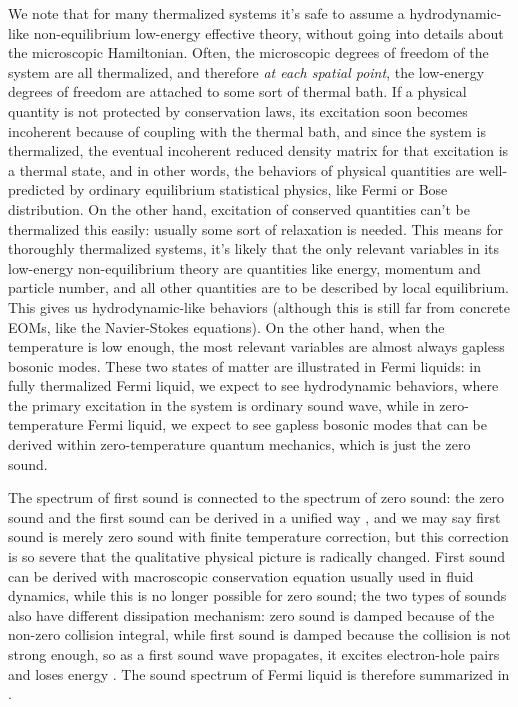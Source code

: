 \documentclass[hyperref, a4paper]{article}
\begin{document}
We note that for many thermalized systems it's safe to assume 
a hydrodynamic-like non-equilibrium low-energy effective theory,
without going into details about the microscopic Hamiltonian.
Often, the microscopic degrees of freedom of the system are all thermalized,
and therefore \emph{at each spatial point},
the low-energy degrees of freedom are attached to some sort of thermal bath.
If a physical quantity is not protected by conservation laws,
its excitation soon becomes incoherent because of coupling with the thermal bath,
and since the system is thermalized,
the eventual incoherent reduced density matrix for that excitation is a thermal state,
and in other words, the behaviors of physical quantities are well-predicted 
by ordinary equilibrium statistical physics,
like Fermi or Bose distribution.
On the other hand, excitation of conserved quantities can't be thermalized this easily:
usually some sort of relaxation is needed.
This means for thoroughly thermalized systems,
it's likely that the only relevant variables in its low-energy non-equilibrium theory 
are quantities like energy, momentum and particle number,
and all other quantities are to be described by local equilibrium.
This gives us hydrodynamic-like behaviors 
(although this is still far from concrete EOMs, like the Navier-Stokes equations).
On the other hand, when the temperature is low enough,
the most relevant variables are almost always gapless bosonic modes.
These two states of matter are illustrated in Fermi liquids:
in fully thermalized Fermi liquid, we expect to see hydrodynamic behaviors,
where the primary excitation in the system is ordinary sound wave,
while in zero-temperature Fermi liquid,
we expect to see gapless bosonic modes that can be derived within zero-temperature quantum mechanics,
which is just the zero sound.

The spectrum of first sound 
is connected to the spectrum of zero sound:
the zero sound and the first sound can be derived 
in a unified way \cite{khalatnikov1958dispersion},
and we may say first sound is 
merely zero sound with finite temperature correction, 
but this correction is so severe that the qualitative physical picture 
is radically changed.
First sound can be derived with macroscopic conservation equation 
usually used in fluid dynamics,
while this is no longer possible for zero sound;
the two types of sounds also have different dissipation mechanism:
zero sound is damped because of the non-zero collision integral,
while first sound is damped because the collision is not strong enough,
so as a first sound wave propagates,
it excites electron-hole pairs 
and loses energy
\cite{abel1966propagation,belitz2022soft}. 
The sound spectrum of Fermi liquid is therefore summarized in .
\end{document}
